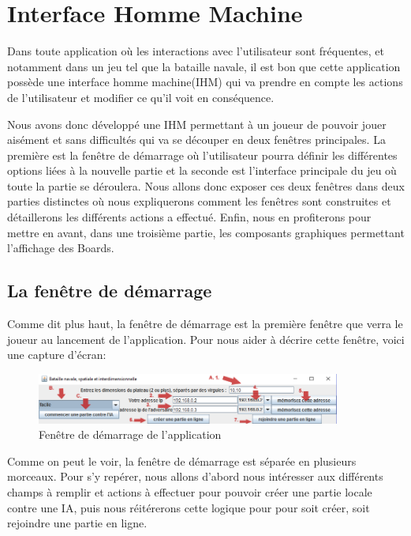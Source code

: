 \section{Interface Homme Machine}
	Dans toute application où les interactions avec l'utilisateur sont fréquentes, et notamment dans un jeu tel que la bataille navale, il est bon que cette application possède une interface homme machine(IHM) qui va prendre en compte les actions de l'utilisateur et modifier ce qu'il voit en conséquence. \newline
	
	Nous avons donc développé une IHM permettant à un joueur de pouvoir jouer aisément et sans difficultés qui va se découper en deux fenêtres principales. La première est la fenêtre de démarrage où l'utilisateur pourra définir les différentes options liées à la nouvelle partie et la seconde est l'interface principale du jeu où toute la partie se déroulera. Nous allons donc exposer ces deux fenêtres dans deux parties distinctes où nous expliquerons comment les fenêtres sont construites et détaillerons les différents actions a effectué. Enfin, nous en profiterons pour mettre en avant, dans une troisième partie, les composants graphiques permettant l'affichage des Boards. 
	
\subsection{La fenêtre de démarrage}
	Comme dit plus haut, la fenêtre de démarrage est la première fenêtre que verra le joueur au lancement de l'application. Pour nous aider à décrire cette fenêtre, voici une capture d'écran:
	
	\begin{figure}[!h]
		\centering
		\includegraphics [width=10cm]{images/start_window.png}
		\caption{Fenêtre de démarrage de l'application}
		\label {startwindow}
	\end{figure}
	
	Comme on peut le voir, la fenêtre de démarrage est séparée en plusieurs morceaux. Pour s'y repérer, nous allons d'abord nous intéresser aux différents champs à remplir et actions à effectuer pour pouvoir créer une partie locale contre une IA, puis nous réitérerons cette logique pour pour soit créer, soit rejoindre une partie en ligne.
	
